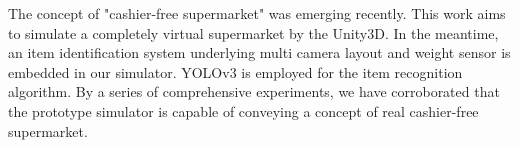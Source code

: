 The concept of "cashier-free supermarket" was emerging recently.
This work aims to simulate a completely virtual supermarket by the Unity3D.
In the meantime, an item identification system underlying multi camera layout and weight sensor
is embedded in our simulator. YOLOv3 is employed for the item recognition algorithm.
By a series of comprehensive experiments, we have corroborated that the prototype simulator is capable of conveying a concept of real cashier-free supermarket.

